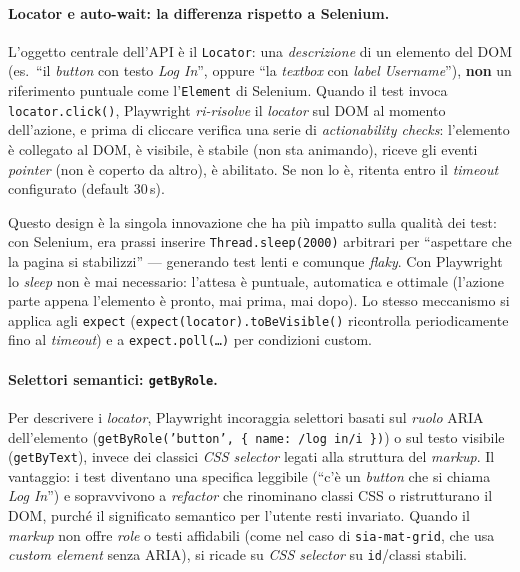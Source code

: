 \paragraph{Locator e auto-wait: la differenza rispetto a Selenium.} L'oggetto centrale dell'API è il \texttt{Locator}: una \emph{descrizione} di un elemento del DOM (es.\ ``il \emph{button} con testo \emph{Log In}'', oppure ``la \emph{textbox} con \emph{label} \emph{Username}''), \textbf{non} un riferimento puntuale come l'\texttt{Element} di Selenium. Quando il test invoca \texttt{locator.click()}, Playwright \emph{ri-risolve} il \emph{locator} sul DOM al momento dell'azione, e prima di cliccare verifica una serie di \emph{actionability checks}: l'elemento è collegato al DOM, è visibile, è stabile (non sta animando), riceve gli eventi \emph{pointer} (non è coperto da altro), è abilitato. Se non lo è, ritenta entro il \emph{timeout} configurato (default $30$\,s).

Questo design è la singola innovazione che ha più impatto sulla qualità dei test: con Selenium, era prassi inserire \texttt{Thread.sleep(2000)} arbitrari per ``aspettare che la pagina si stabilizzi'' — generando test lenti e comunque \emph{flaky}. Con Playwright lo \emph{sleep} non è mai necessario: l'attesa è puntuale, automatica e ottimale (l'azione parte appena l'elemento è pronto, mai prima, mai dopo). Lo stesso meccanismo si applica agli \texttt{expect} (\texttt{expect(locator).toBeVisible()} ricontrolla periodicamente fino al \emph{timeout}) e a \texttt{expect.poll(\dots)} per condizioni custom.

\paragraph{Selettori semantici: \texttt{getByRole}.} Per descrivere i \emph{locator}, Playwright incoraggia selettori basati sul \emph{ruolo} ARIA dell'elemento (\texttt{getByRole('button', \{ name: /log in/i \})}) o sul testo visibile (\texttt{getByText}), invece dei classici \emph{CSS selector} legati alla struttura del \emph{markup}. Il vantaggio: i test diventano una specifica leggibile (``c'è un \emph{button} che si chiama \emph{Log In}'') e sopravvivono a \emph{refactor} che rinominano classi CSS o ristrutturano il DOM, purché il significato semantico per l'utente resti invariato. Quando il \emph{markup} non offre \emph{role} o testi affidabili (come nel caso di \texttt{sia-mat-grid}, che usa \emph{custom element} senza ARIA), si ricade su \emph{CSS selector} su \texttt{id}/classi stabili.

